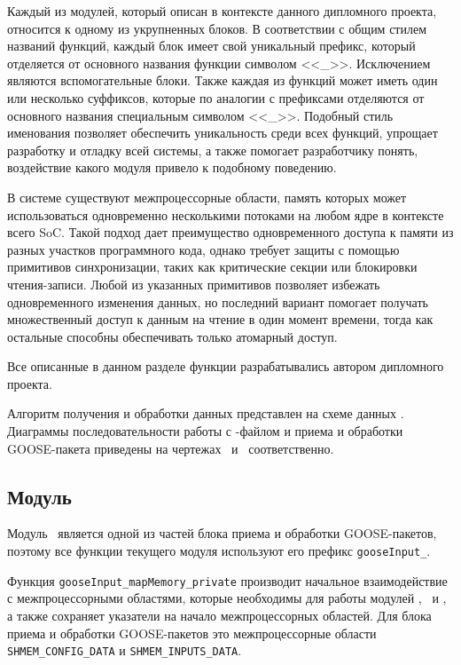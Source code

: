 Каждый из модулей, который описан в контексте данного дипломного проекта,
относится к одному из укрупненных блоков. В соответствии с общим стилем
названий функций, каждый блок имеет свой уникальный префикс, который
отделяется от основного названия функции символом <<\_>>.
Исключением являются вспомогательные блоки.
Также каждая из функций может иметь один или несколько суффиксов,
которые по аналогии с префиксами отделяются от основного
названия специальным символом <<\_>>.
Подобный стиль именования позволяет обеспечить уникальность среди всех функций,
упрощает разработку и отладку всей системы, а также помогает разработчику
понять, воздействие какого модуля привело к подобному поведению.

В системе существуют межпроцессорные области, память которых может использоваться одновременно несколькими потоками на любом ядре в контексте всего SoC.
Такой подход дает преимущество одновременного доступа к памяти из разных участков программного кода, однако требует защиты с
помощью примитивов синхронизации, таких как критические секции или блокировки
чтения-записи.
Любой из указанных примитивов позволяет избежать одновременного изменения данных,
но последний вариант помогает получать множественный доступ к данным на чтение
в один момент времени, тогда как остальные способны обеспечивать только атомарный доступ.

Все описанные в данном разделе функции разрабатывались автором дипломного проекта.


Алгоритм получения и обработки данных представлен на схеме
данных \dataScheme. Диаграммы последовательности работы с \cid-файлом и
приема и обработки GOOSE-пакета приведены
на чертежах \seqIcdScheme\ и \seqGooseScheme\ соответственно.

\subsection{Модуль \moduleSettingsApply}

Модуль \moduleSettingsApply\ является одной из частей блока приема и обработки
GOOSE-пакетов, поэтому все функции текущего модуля используют его префикс
\lstinline{gooseInput_}.

Функция \lstinline{gooseInput_mapMemory_private} производит начальное взаимодействие
с межпроцессорными областями, которые необходимы для работы модулей
\moduleRecvPackets, \moduleThreads\ и \moduleProcessPackets, а также
сохраняет указатели на начало
межпроцессорных областей.
Для блока приема и обработки GOOSE-пакетов это
межпроцессорные области \lstinline{SHMEM_CONFIG_DATA} и \lstinline{SHMEM_INPUTS_DATA}.

